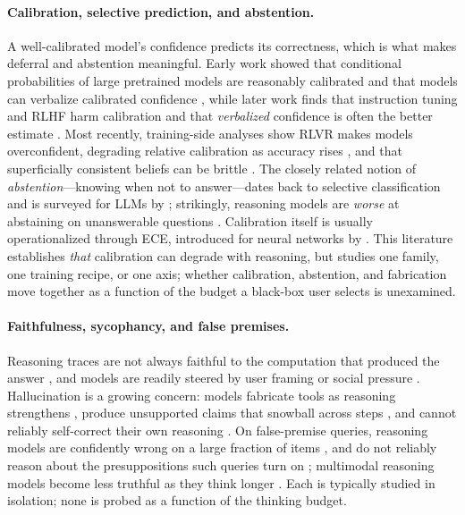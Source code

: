 \documentclass[11pt]{article}
\begin{document}
\paragraph{Calibration, selective prediction, and abstention.}
A well-calibrated model's confidence predicts its correctness, which is what
makes deferral and abstention meaningful.
Early work showed that conditional probabilities of large pretrained models
are reasonably calibrated and that models can verbalize calibrated confidence
\citep{Kadavath2022KnowWhatTheyKnow, Lin2022Verbalized}, while
later work finds that instruction tuning and RLHF harm calibration and that
\emph{verbalized} confidence is often the better estimate
\citep{Tian2023JustAsk, Xiong2023Confidence, SanzGuerrero2026Overconfident}.
Most recently, training-side analyses show RLVR makes models overconfident,
degrading relative calibration as accuracy rises
\citep{Wang2026CAPO, Jin2025Entropy}, and that superficially consistent
beliefs can be brittle \citep{Xu2026IllusionConfidence}.
The closely related notion of \emph{abstention}---knowing when not to
answer---dates back to selective classification \citep{Geifman2017Selective}
and is surveyed for LLMs by \citet{Slobodkin2024Abstention}; strikingly,
reasoning models are \emph{worse} at abstaining on unanswerable questions
\citep{Kirichenko2025AbstentionBench}.
Calibration itself is usually operationalized through ECE, introduced for
neural networks by \citet{Guo2017ECE}.
This literature establishes \emph{that} calibration can degrade with
reasoning, but studies one family, one training recipe, or one axis; whether
calibration, abstention, and fabrication move together as a function of the
budget a black-box user selects is unexamined.

\paragraph{Faithfulness, sycophancy, and false premises.}
Reasoning traces are not always faithful to the computation that produced
the answer \citep{Turpin2023Unfaithful, Chen2025DontSay}, and
models are readily steered by user framing or social pressure
\citep{Sharma2023Sycophancy}.
Hallucination is a growing concern: models fabricate tools as reasoning
strengthens \citep{Yin2025ReasoningTrap}, produce unsupported claims that
snowball across steps \citep{Zhang2023Snowball}, and cannot reliably
self-correct their own reasoning \citep{Huang2024SelfCorrect}.
On false-premise queries, reasoning models are confidently wrong on a large
fraction of items \citep{Sathyanathan2025Presuppositions}, and do not reliably
reason about the presuppositions such queries turn on
\citep{Xu2026Presupposition}; multimodal reasoning models become less truthful
as they think longer \citep{Fang2025Slower}.
Each is typically studied in isolation; none is probed as a function of the
thinking budget.
\end{document}
